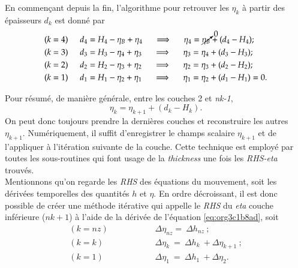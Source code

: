 \documentclass[10pt]{article}
\numberwithin{equation}{section}
\begin{document}
En commençant depuis la fin, l'algorithme pour retrouver les \(\eta_k\) à partir des épaisseurs \(d_k\) est donné par
\begin{align}
        & (k=4) \hspace{0.5cm} d_4 = H_4 - \eta_B + \eta_4 \hspace{0.5cm} \Longrightarrow \hspace{0.5cm} \eta_4 = \cancelto{0}{\eta_B} + (d_4 - H_4); \\
        & (k=3) \hspace{0.5cm} d_3 = H_3 - \eta_4 + \eta_3 \hspace{0.5cm} \Longrightarrow \hspace{0.5cm} \eta_3 =\eta_4+(d_3-H_3);\\
        & (k=2) \hspace{0.5cm} d_2 = H_2 - \eta_3 + \eta_2 \hspace{0.5cm} \Longrightarrow \hspace{0.5cm} \eta_2 =\eta_3+(d_2-H_2);\\
        & (k=1) \hspace{0.5cm} d_1 = H_1 - \eta_2 + \eta_1 \hspace{0.5cm} \Longrightarrow \hspace{0.5cm} \eta_1 =\eta_2+(d_1-H_1) = 0.
\end{align}

Pour résumé, de manière générale, entre les couches 2 et \emph{nk-1},
\begin{equation}
\label{eq:org3c1b8ad}
\eta_k = \eta_{k+1} + (d_k - H_k).
\end{equation}
On peut donc toujours prendre la dernières couches et reconstruire les autres \(\eta_{k+1}\).
Numériquement, il suffit d'enregistrer le champs scalaire \(\eta_{k+1}\) et de l'appliquer à l'itération suivante de la couche.
Cette technique est employé par toutes les sous-routines qui font usage de la \emph{thickness} une fois les \emph{RHS-eta} trouvés.\\[0pt]


Mentionnons qu'on regarde les \emph{RHS} des équations du mouvement, soit les dérivées temporelles des quantités \(h\) et \(\eta\).
En ordre décroissant, il est donc possible de créer une méthode itérative qui appelle le \emph{RHS} du \emph{eta} couche inférieure (\(nk+1\)) à l'aide de la dérivée de l'équation \ref{eq:org3c1b8ad}, soit
\begin{align}
(k=nz)\hspace{2cm}    &\Delta \eta_{nz} =\ \Delta h_{nz}\ ;\nonumber\\
(k=k) \hspace{2cm} &\Delta \eta_{k}\ = \ \Delta h_k\ + \Delta \eta_{k+1}\ ;\\
(k=1) \hspace{2cm} &\Delta \eta_1\ = \ \Delta h_1\ + \Delta \eta_2. \nonumber 
\end{align}
\end{document}
